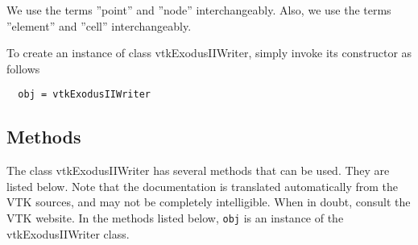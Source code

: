      We use the terms ''point'' and ''node'' interchangeably.
     Also, we use the terms ''element'' and ''cell'' interchangeably.

To create an instance of class vtkExodusIIWriter, simply
invoke its constructor as follows
\begin{verbatim}
  obj = vtkExodusIIWriter
\end{verbatim}
\subsection{Methods}

The class vtkExodusIIWriter has several methods that can be used.
  They are listed below.
Note that the documentation is translated automatically from the VTK sources,
and may not be completely intelligible.  When in doubt, consult the VTK website.
In the methods listed below, \verb|obj| is an instance of the vtkExodusIIWriter class.
